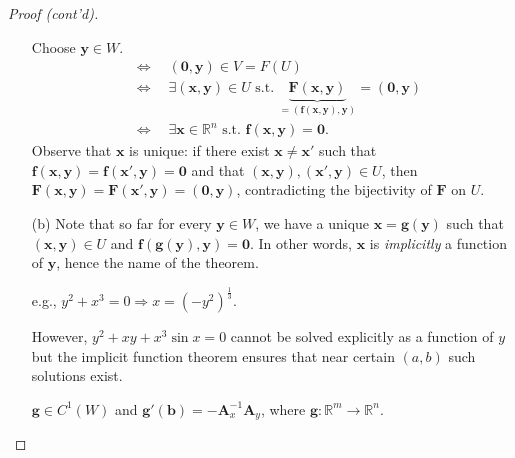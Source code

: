\documentclass[letterpaper, reqno,11pt]{article}
\newcommand{\RR}{\mathbb{R}}
\begin{document}
\begin{proof}[Proof (cont'd)]
\begin{enumerate}
    Choose $\mathbf y \in W$.
    \begin{align*}
      &\Leftrightarrow \quad (\mathbf 0, \mathbf y) \in V = F(U) \\
      &\Leftrightarrow \quad \exists (\mathbf x, \mathbf y) \in U \text{ s.t. } \underbrace{\mathbf F(\mathbf x, \mathbf y)}_{= (\mathbf f(\mathbf x, \mathbf y), \mathbf y)} = (\mathbf 0, \mathbf y) \\
      &\Leftrightarrow \quad \exists \mathbf x \in \RR^n \text{ s.t. } \mathbf f(\mathbf x, \mathbf y) = \mathbf 0.
    \end{align*}
    Observe that $\mathbf x$ is unique: if there exist $\mathbf x \neq \mathbf x'$ such that $\mathbf f(\mathbf x, \mathbf y) = \mathbf f(\mathbf x', \mathbf y) = \mathbf 0$ and that $(\mathbf x, \mathbf y), (\mathbf x', \mathbf y) \in U$, then $\mathbf F(\mathbf x, \mathbf y) = \mathbf F(\mathbf x', \mathbf y) = (\mathbf 0, \mathbf y)$, contradicting the bijectivity of $\mathbf F$ on $U$.
  \item[(b)] Note that so far for every $\mathbf y \in W$, we have a unique $\mathbf x = \mathbf g(\mathbf y)$ such that $(\mathbf x, \mathbf y) \in U$ and $\mathbf f(\mathbf g(\mathbf y), \mathbf y) = \mathbf 0$. In other words, $\mathbf x$ is \emph{implicitly} a function of $\mathbf y$, hence the name of the theorem.

    e.g., $y^2 + x^3 = 0 \Rightarrow x = \left(-y^2\right)^\frac{1}{3}$.

    However, $y^2 + xy + x^3 \sin x = 0$ cannot be solved explicitly as a function of $y$ but the implicit function theorem ensures that near certain $(a, b)$ such solutions exist.

     $\mathbf g \in C^1(W)$ and $\mathbf g'(\mathbf b) = -\mathbf A_x^{-1} \mathbf A_y$, where $\mathbf g : \RR^m \to \RR^n$.


\end{enumerate}
\end{proof}
\end{document}
